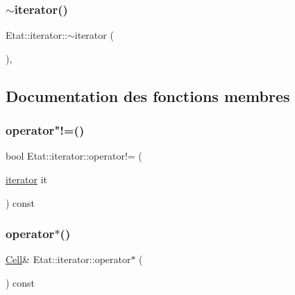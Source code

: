 \mbox{\label{class_etat_1_1iterator_a6748d8aed797bb910dd9816410c2adb3}} 
\subsubsection{\texorpdfstring{$\sim$iterator()}{~iterator()}}
{\footnotesize\ttfamily Etat\+::iterator\+::$\sim$iterator (\begin{DoxyParamCaption}{ }\end{DoxyParamCaption})\hspace{0.3cm}{\ttfamily [inline]}, {\ttfamily [private]}}



\subsection{Documentation des fonctions membres}
\mbox{\label{class_etat_1_1iterator_a5fd28a48c9b5ae5ccb7c3223dfcbd2da}} 
\subsubsection{\texorpdfstring{operator"!=()}{operator!=()}}
{\footnotesize\ttfamily bool Etat\+::iterator\+::operator!= (\begin{DoxyParamCaption}\item[{\mbox{\hyperlink{class_etat_1_1iterator}{iterator}}}]{it }\end{DoxyParamCaption}) const\hspace{0.3cm}{\ttfamily [inline]}}

\mbox{\label{class_etat_1_1iterator_ab9a283bfd82bf15cac4f21422ceee680}} 
\subsubsection{\texorpdfstring{operator$\ast$()}{operator*()}}
{\footnotesize\ttfamily \mbox{\hyperlink{class_cell}{Cell}}\& Etat\+::iterator\+::operator$\ast$ (\begin{DoxyParamCaption}{ }\end{DoxyParamCaption}) const\hspace{0.3cm}{\ttfamily [inline]}}

